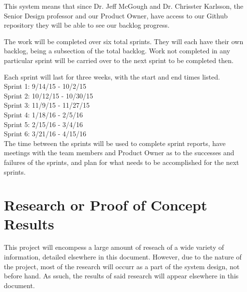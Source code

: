 This system means that since Dr. Jeff McGough and Dr. Chrisster Karlsson, the Senior Design professor and our Product Owner, have access to our Github repository they will be able to see our backlog progress.

The work will be completed over six total sprints. They will each have their own backlog, being a subsection of the total backlog. Work not completed in any particular sprint will be carried over to the next sprint to be completed then.

Each sprint will last for three weeks, with the start and end times listed. \\

Sprint 1: 9/14/15 - 10/2/15 \\
Sprint 2: 10/12/15 - 10/30/15 \\
Sprint 3: 11/9/15 - 11/27/15 \\
Sprint 4: 1/18/16 - 2/5/16 \\
Sprint 5: 2/15/16 - 3/4/16 \\
Sprint 6: 3/21/16 - 4/15/16 \\

The time between the sprints will be used to complete sprint reports, have meetings with the team members and Product Owner as to the successes and failures of the sprints, and plan for what needs to be accomplished for the next sprints.




\section{Research or Proof of Concept Results}


This project will encompess a large amount of reseach of a wide variety of information, detailed elsewhere in this document. However, due to the nature of the project, most of the research will occurr as a part of the system design, not before hand. As ssuch, the results of said research will appear elsewhere in this document.


